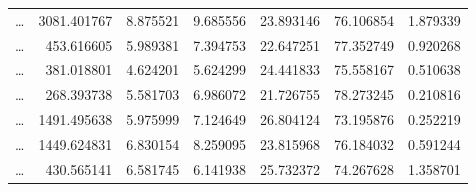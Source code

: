 \documentclass[a4paper,12pt,openany,oneside]{book}
\begin{document}
\begin{table}[H]
\begin{tabularx}{0.87\textwidth}{crrrrrr}
        \dots &  3081.401767 &           8.875521 &         9.685556 & 23.893146 & 76.106854        & 1.879339 \\
        \dots &  453.616605 &           5.989381 &         7.394753 & 22.647251 & 77.352749         & 0.920268 \\
        \dots &  381.018801 &           4.624201 &         5.624299 & 24.441833 & 75.558167        & 0.510638 \\
        \dots &  268.393738 &           5.581703 &         6.986072 & 21.726755 & 78.273245         & 0.210816 \\
        \dots &  1491.495638 &           5.975999 &         7.124649 & 26.804124 & 73.195876        & 0.252219 \\
        \dots &  1449.624831 &           6.830154 &         8.259095 & 23.815968 & 76.184032        & 0.591244 \\
        \dots &  430.565141 &           6.581745 &         6.141938 & 25.732372 & 74.267628        & 1.358701 \\
	\end{tabularx}
	\label{table:heroes_stats}
\end{table}
\end{document}
